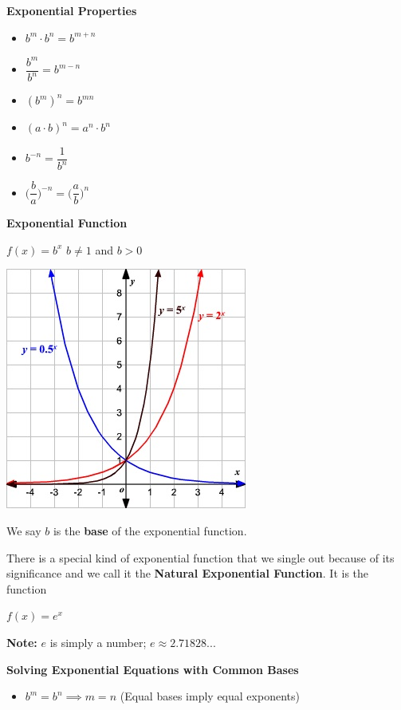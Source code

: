 \documentclass[12pt]{article}
\begin{document}
\textbf{Exponential Properties}

\begin{itemize}

\item $b^{m} \cdot b^{n} = b^{m+n}$
\item $\dfrac{b^{m}}{b^{n}} = b^{m-n}$
\item $(b^{m})^{n} = b^{mn}$
\item $(a \cdot b)^{n} = a^{n} \cdot b^{n}$
\item $b^{-n} = \dfrac{1}{b^{n}}$
\item $\Big( \dfrac{b}{a} \Big)^{-n} = \Big( \dfrac{a}{b} \Big)^{n}$

\end{itemize}

\textbf{Exponential Function}
\newline

\centerline{$f(x) = b^x$ \hspace{2cm} $b\neq 1$ and $b > 0$} 

\vspace{.5cm}

\centerline{\includegraphics{ExponentialFunctionsAndGraphs.jpg}}

We say $b$ is the \textbf{base} of the exponential function.

There is a special kind of exponential function that we single out because of its significance and we call it the \textbf{Natural Exponential Function}. It is the function
\newline

\centerline{$f(x) = e^{x}$}

\textbf{Note:} $e$ is simply a number; $e \approx 2.71828...$

\textbf{Solving Exponential Equations with Common Bases}

\begin{itemize}

\item $b^{m} = b^{n} \implies m = n$ (Equal bases imply equal exponents)

\end{itemize}
\end{document}
